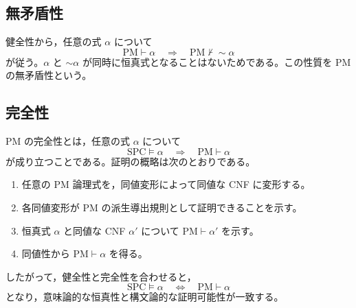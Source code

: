 \documentclass[../main.tex]{subfiles}
\begin{document}
\subsection{無矛盾性}

健全性から，任意の式 \(\alpha\) について
\[
  \mathrm{PM}\vdash\alpha
  \quad\Longrightarrow\quad
  \mathrm{PM}\nvdash\sim\alpha
\]
が従う。\(\alpha\) と \(\sim\alpha\) が同時に恒真式となることはないためである。この性質を PM の無矛盾性という。

\subsection{完全性}

PM の完全性とは，任意の式 \(\alpha\) について
\[
  \mathrm{SPC}\vDash\alpha
  \quad\Longrightarrow\quad
  \mathrm{PM}\vdash\alpha
\]
が成り立つことである。証明の概略は次のとおりである。
\begin{enumerate}
  \item 任意の PM 論理式を，同値変形によって同値な CNF に変形する。
  \item 各同値変形が PM の派生導出規則として証明できることを示す。
  \item 恒真式 \(\alpha\) と同値な CNF \(\alpha'\) について \(\mathrm{PM}\vdash\alpha'\) を示す。
  \item 同値性から \(\mathrm{PM}\vdash\alpha\) を得る。
\end{enumerate}

したがって，健全性と完全性を合わせると，
\[
  \mathrm{SPC}\vDash\alpha
  \quad\Longleftrightarrow\quad
  \mathrm{PM}\vdash\alpha
\]
となり，意味論的な恒真性と構文論的な証明可能性が一致する。
\end{document}
